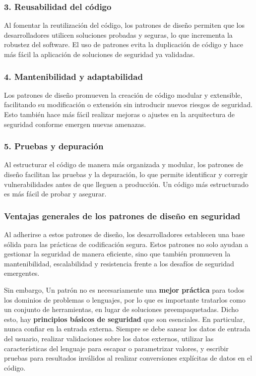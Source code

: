 \subsubsection{3. \textbf{Reusabilidad del código}}

Al fomentar la reutilización del código, los patrones de diseño permiten que los desarrolladores utilicen soluciones probadas y seguras, lo que incrementa la robustez del software. El uso de patrones evita la duplicación de código y hace más fácil la aplicación de soluciones de seguridad ya validadas.

\subsubsection{4. \textbf{Mantenibilidad y adaptabilidad}}

Los patrones de diseño promueven la creación de código modular y extensible, facilitando su modificación o extensión sin introducir nuevos riesgos de seguridad. Esto también hace más fácil realizar mejoras o ajustes en la arquitectura de seguridad conforme emergen nuevas amenazas.

\subsubsection{5. \textbf{Pruebas y depuración}}

Al estructurar el código de manera más organizada y modular, los patrones de diseño facilitan las pruebas y la depuración, lo que permite identificar y corregir vulnerabilidades antes de que lleguen a producción. Un código más estructurado es más fácil de probar y asegurar.

\subsubsection{Ventajas generales de los patrones de diseño en seguridad}

Al adherirse a estos patrones de diseño, los desarrolladores establecen una base sólida para las prácticas de codificación segura. Estos patrones no solo ayudan a gestionar la seguridad de manera eficiente, sino que también promueven la mantenibilidad, escalabilidad y resistencia frente a los desafíos de seguridad emergentes.

Sin embargo, Un patrón no es necesariamente una \textbf{mejor práctica} para todos los dominios de problemas o lenguajes, por lo que es importante tratarlos como un conjunto de herramientas, en lugar de soluciones preempaquetadas. Dicho esto, hay \textbf{principios básicos de seguridad} que son esenciales. En particular, nunca confiar en la entrada externa. Siempre se debe sanear los datos de entrada del usuario, realizar validaciones sobre los datos externos, utilizar las características del lenguaje para escapar o parametrizar valores, y escribir pruebas para resultados inválidos al realizar conversiones explícitas de datos en el código.